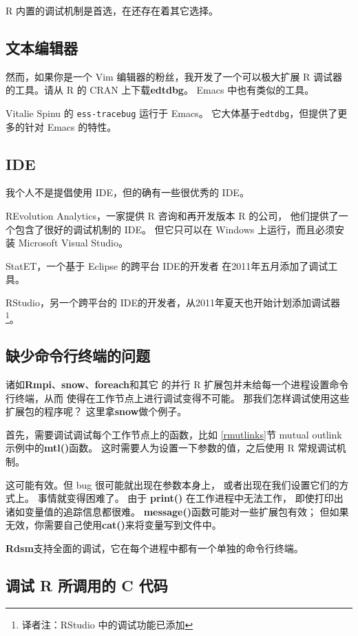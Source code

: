 R 内置的调试机制是首选，在还存在着其它选择。

\subsection{文本编辑器}

然而，如果你是一个 Vim 编辑器的粉丝，我开发了一个可以极大扩展 R 调试器
的工具。请从 R 的 CRAN 上下载{\bf edtdbg}。
Emacs 中也有类似的工具。

Vitalie Spinu 的 {\tt ess-tracebug} 运行于 Emacs。
它大体基于{\tt edtdbg}，但提供了更多的针对 Emacs 的特性。

\subsection{IDE}

我个人不是提倡使用 IDE，但的确有一些很优秀的 IDE。

REvolution Analytics，一家提供 R 咨询和再开发版本 R 的公司，
他们提供了一个包含了很好的调试机制的 IDE。
但它只可以在 Windows 上运行，而且必须安装 Microsoft Visual Studio。

StatET，一个基于 Eclipse 的跨平台 IDE的开发者
在2011年五月添加了调试工具。


RStudio，另一个跨平台的 IDE的开发者，从2011年夏天也开始计划添加调试器
\footnote{译者注：RStudio 中的调试功能已添加}。


\subsection{缺少命令行终端的问题}

诸如{\bf Rmpi}、{\bf snow}、{\bf foreach}和其它
的并行 R 扩展包并未给每一个进程设置命令行终端，从而
使得在工作节点上进行调试变得不可能。
那我们怎样调试使用这些扩展包的程序呢？
这里拿{\bf snow}做个例子。

首先，需要调试调试每个工作节点上的函数，比如
\ref{rmutlinks}节 mutual outlink 示例中的{\bf mtl()}函数。
这时需要人为设置一下参数的值，之后使用 R 常规调试机制。 


这可能有效。但 bug 很可能就出现在参数本身上，
或者出现在我们设置它们的方式上。
事情就变得困难了。
由于 {\bf print()} 在工作进程中无法工作，
即使打印出诸如变量值的追踪信息都很难。
{\bf message()}函数可能对一些扩展包有效；
但如果无效，你需要自己使用{\bf cat()}来将变量写到文件中。 

{\bf Rdsm}支持全面的调试，它在每个进程中都有一个单独的命令行终端。 

\subsection{调试 R 所调用的 C 代码}

